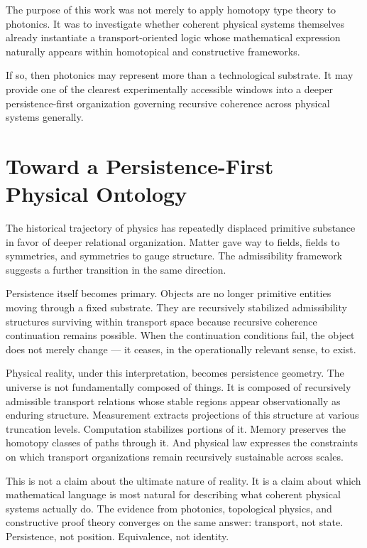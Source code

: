 \documentclass[11pt,openany]{book}
\theoremstyle{definition}
\theoremstyle{plain}
\begin{document}
The purpose of this work was not merely to apply homotopy type theory to photonics. It was to investigate whether coherent physical systems themselves already instantiate a transport-oriented logic whose mathematical expression naturally appears within homotopical and constructive frameworks.

If so, then photonics may represent more than a technological substrate. It may provide one of the clearest experimentally accessible windows into a deeper persistence-first organization governing recursive coherence across physical systems generally.

\section{Toward a Persistence-First Physical Ontology}

The historical trajectory of physics has repeatedly displaced primitive substance in favor of deeper relational organization. Matter gave way to fields, fields to symmetries, and symmetries to gauge structure. The admissibility framework suggests a further transition in the same direction.

Persistence itself becomes primary. Objects are no longer primitive entities moving through a fixed substrate. They are recursively stabilized admissibility structures surviving within transport space because recursive coherence continuation remains possible. When the continuation conditions fail, the object does not merely change --- it ceases, in the operationally relevant sense, to exist.

Physical reality, under this interpretation, becomes persistence geometry. The universe is not fundamentally composed of things. It is composed of recursively admissible transport relations whose stable regions appear observationally as enduring structure. Measurement extracts projections of this structure at various truncation levels. Computation stabilizes portions of it. Memory preserves the homotopy classes of paths through it. And physical law expresses the constraints on which transport organizations remain recursively sustainable across scales.

This is not a claim about the ultimate nature of reality. It is a claim about which mathematical language is most natural for describing what coherent physical systems actually do. The evidence from photonics, topological physics, and constructive proof theory converges on the same answer: transport, not state. Persistence, not position. Equivalence, not identity.
\end{document}
